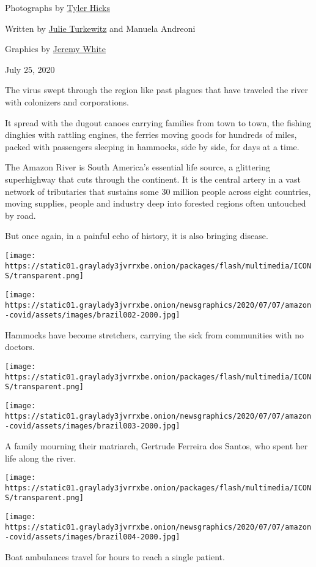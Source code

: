 Photographs by
\href{https://www.nytimes3xbfgragh.onion/by/tyler-hicks}{Tyler Hicks}

Written by
\href{https://www.nytimes3xbfgragh.onion/by/julie-turkewitz}{Julie
Turkewitz} and Manuela Andreoni

Graphics by
\href{https://www.nytimes3xbfgragh.onion/by/jeremy-white}{Jeremy White}

July 25, 2020

The virus swept through the region like past plagues that have traveled
the river with colonizers and corporations.

It spread with the dugout canoes carrying families from town to town,
the fishing dinghies with rattling engines, the ferries moving goods for
hundreds of miles, packed with passengers sleeping in hammocks, side by
side, for days at a time.

The Amazon River is South America's essential life source, a glittering
superhighway that cuts through the continent. It is the central artery
in a vast network of tributaries that sustains some 30 million people
across eight countries, moving supplies, people and industry deep into
forested regions often untouched by road.

But once again, in a painful echo of history, it is also bringing
disease.

\texttt{[image: https://static01.graylady3jvrrxbe.onion/packages/flash/multimedia/ICONS/transparent.png]}

\texttt{[image: https://static01.graylady3jvrrxbe.onion/newsgraphics/2020/07/07/amazon-covid/assets/images/brazil002-2000.jpg]}

Hammocks have become stretchers, carrying the sick from communities with
no doctors.

\texttt{[image: https://static01.graylady3jvrrxbe.onion/packages/flash/multimedia/ICONS/transparent.png]}

\texttt{[image: https://static01.graylady3jvrrxbe.onion/newsgraphics/2020/07/07/amazon-covid/assets/images/brazil003-2000.jpg]}

A family mourning their matriarch, Gertrude Ferreira dos Santos, who
spent her life along the river.

\texttt{[image: https://static01.graylady3jvrrxbe.onion/packages/flash/multimedia/ICONS/transparent.png]}

\texttt{[image: https://static01.graylady3jvrrxbe.onion/newsgraphics/2020/07/07/amazon-covid/assets/images/brazil004-2000.jpg]}

Boat ambulances travel for hours to reach a single patient.

